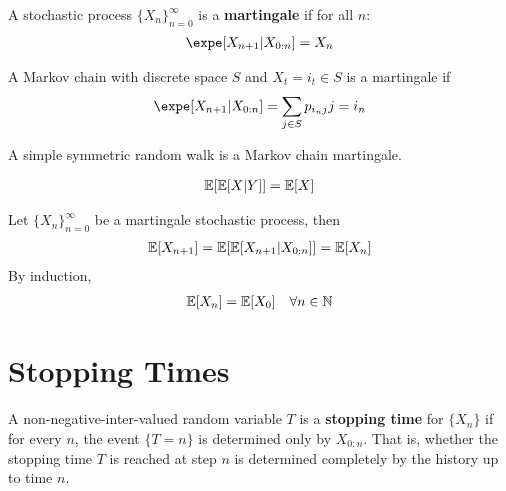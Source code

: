 \documentclass{article}
\begin{document}
	\begin{definition}
		A stochastic process $\{X_n\}_{n=0}^\infty$ is a \textbf{martingale} if for all $n$:
		\begin{align}
			\expe [X_{n+1} | X_{0:n}] = X_n
		\end{align}
	\end{definition}
	
	\begin{proposition}
		A Markov chain with discrete space $S$ and $X_t = i_t \in S$ is a martingale if
		\begin{align}
			\expe [X_{n+1}|X_{0:n}] = \sum_{j \in S} p_{i_{n} j} j = i_n
		\end{align}
	\end{proposition}
	
	\begin{example}
		A simple symmetric random walk is a Markov chain martingale.
	\end{example}
	
	\begin{lemma}
		\begin{align}
			\mathbb{E}[{\mathbb{E}[{X|Y}]}] = \mathbb{E}[{X}]
		\end{align}
	\end{lemma}
	
	\begin{proposition}
		Let $\{X_n\}_{n=0}^\infty$ be a martingale stochastic process, then
		\begin{align}
			\mathbb{E}[{X_{n+1}}] = \mathbb{E}[{\mathbb{E}[{X_{n+1}|X_{0:n}}]}] = \mathbb{E}[{X_n}]
		\end{align}
		By induction,
		\begin{align}
			\mathbb{E}[{X_n}] = \mathbb{E}[{X_0}]\quad \forall n \in \mathbb{N}
		\end{align}
	\end{proposition}
	
	\section{Stopping Times}
	\begin{definition}
		A non-negative-inter-valued random variable $T$ is a \textbf{stopping time} for $\{X_n\}$ if for every $n$, the event $\{T=n\}$ is determined only by $X_{0:n}$. That is, whether the stopping time $T$ is reached at step $n$ is determined completely by the history up to time $n$.
	\end{definition}
	
\end{document}
